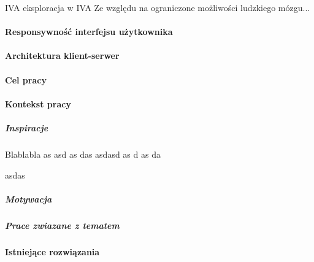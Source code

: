 IVA
eksploracja w IVA
Ze względu na ograniczone możliwości ludzkiego mózgu...

\paragraph{Responsywność interfejsu użytkownika}

\paragraph{Architektura klient-serwer}

\paragraph{Cel pracy}

\paragraph{Kontekst pracy}

\subparagraph{Inspiracje}

Blablabla
as
asd
as
das
asdasd
as
d
as
da



asdas

\subparagraph{Motywacja}

\subparagraph{Prace zwiazane z tematem}

\paragraph{Istniejące rozwiązania}




